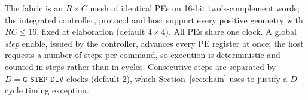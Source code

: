 The fabric is an $R\times C$ mesh of identical PEs on 16-bit two's-complement
words; the integrated controller, protocol and host support every positive
geometry with $RC\le16$, fixed at elaboration (default $4\times4$). All PEs
share one clock. A global \emph{step} enable, issued by the controller,
advances every PE register at once; the host requests a number of steps per
command, so execution is deterministic and counted in steps rather than in
cycles. Consecutive steps are separated by $D=\texttt{G\_STEP\_DIV}$ clocks
(default 2), which Section~\ref{sec:chain} uses to justify a $D$-cycle timing
exception.
